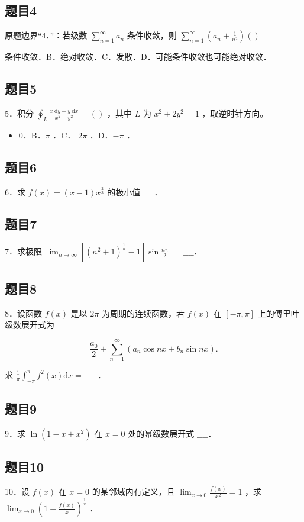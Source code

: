\documentclass{article}
\begin{document}
\subsection{题目4}
原题边界“4．”：若级数 \(\sum_{n=1}^{\infty} a_{n}\) 条件收敛，则 \(\sum_{n=1}^{\infty}\left(a_{n}+\frac{1}{n^{2}}\right)()\)
  \item[A．] 条件收敛．B．绝对收敛．C．发散．D．可能条件收敛也可能绝对收敛．

\subsection{题目5}
5．积分 \(\oint_{L} \frac{x \mathrm{~d} y-y \mathrm{~d} x}{x^{2}+y^{2}}=()\) ，其中 \(L\) 为 \(x^{2}+2 y^{2}=1\) ，取逆时针方向。

\begin{itemize}
  \item[A．] 0．B．\(\pi\) ．C． \(2 \pi\) ．D．\(-\pi\) ．
\end{itemize}

\subsection{题目6}
6．求 \(f(x)=(x-1) x^{\frac{2}{3}}\) 的极小值 \(\_\_\_\_\)．

\subsection{题目7}
7．求极限 \(\lim _{n \rightarrow \infty}\left[\left(n^{2}+1\right)^{\frac{1}{n}}-1\right] \sin \frac{n \pi}{2}=\) \(\_\_\_\_\)．

\subsection{题目8}
8．设函数 \(f(x)\) 是以 \(2 \pi\) 为周期的连续函数，若 \(f(x)\) 在 \([-\pi, \pi]\) 上的傅里叶级数展开式为

\[
\frac{a_{0}}{2}+\sum_{n=1}^{\infty}\left(a_{n} \cos n x+b_{n} \sin n x\right) .
\]

求 \(\frac{1}{\pi} \int_{-\pi}^{\pi} f^{2}(x) \mathrm{d} x=\) \(\_\_\_\_\)．

\subsection{题目9}
9．求 \(\ln \left(1-x+x^{2}\right)\) 在 \(x=0\) 处的幂级数展开式 \(\_\_\_\_\)．

\subsection{题目10}
10．设 \(f(x)\) 在 \(x=0\) 的某邻域内有定义，且 \(\lim _{x \rightarrow 0} \frac{f(x)}{x^{2}}=1\) ，求 \(\lim _{x \rightarrow 0}\left(1+\frac{f(x)}{x}\right)^{\frac{1}{x}}\) ．
\end{document}
